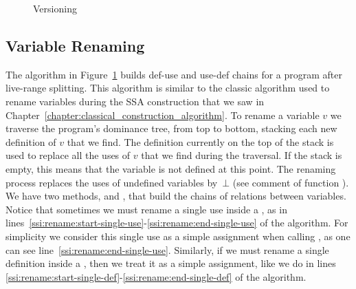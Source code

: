 {\begin{figure}[htbp]
  \begin{algorithm}[H]
  \end{algorithm}

  \begin{algorithm}[H]
  \end{algorithm}
    \caption{Versioning}
    \label{fig:Rename}
\end{figure}

\subsection{Variable Renaming}


The \ssiRename algorithm in Figure~\ref{fig:Rename} builds def-use and use-def chains
for a program after live-range splitting.
This algorithm is similar to the classic algorithm used to rename variables
during the SSA construction that we saw in Chapter~\ref{chapter:classical_construction_algorithm}.
To rename a variable $v$ we traverse the program's dominance tree, from top to
bottom, stacking each new definition of $v$ that we find.
The definition currently on the top of the stack is used to replace all the
uses of $v$ that we find during the traversal.
If the stack is empty, this means that the variable is not defined at this point.
The renaming process replaces the uses of undefined variables by~$\bot$ (see comment of function \ssiStackSetUse).
We have two methods, \ssiStackSetUse and \ssiStackSetDef, that build the chains of relations between variables.
Notice that sometimes we must rename a single use inside a \phifun, as in lines~\ref{ssi:rename:start-single-use}-\ref{ssi:rename:end-single-use} of the algorithm.
For simplicity we consider this single use as a simple assignment when calling \ssiStackSetUse, as one can see line~\ref{ssi:rename:end-single-use}.
Similarly, if we must rename a single definition inside a \sigmafun, then we treat it as a simple assignment, like we do in lines \ref{ssi:rename:start-single-def}-\ref{ssi:rename:end-single-def} of the algorithm.

}
